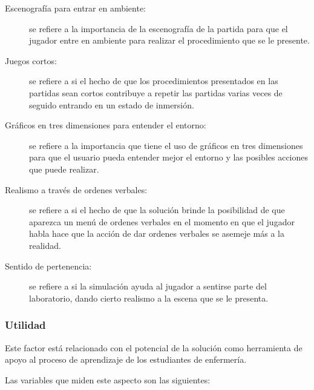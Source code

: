 \begin{description}

\item[Escenografía para entrar en ambiente:] se refiere a la importancia de la
    escenografía de la partida para que el jugador entre en ambiente para
    realizar el procedimiento que se le presente.

\item[Juegos cortos:] se refiere a si el hecho de
    que los procedimientos presentados en las partidas sean cortos contribuye a
    repetir las partidas varias veces de seguido entrando en un estado de
    inmersión.

\item[Gráficos en tres dimensiones para entender el entorno:] se refiere a la
    importancia que tiene el uso de gráficos en tres dimensiones para que el
    usuario pueda entender mejor el entorno y las posibles acciones que puede
    realizar.

\item[Realismo a través de ordenes verbales:] se refiere a si el hecho de que la
    solución brinde la posibilidad de que aparezca un menú de ordenes verbales
    en el momento en que el jugador habla hace que la acción de dar ordenes
    verbales se asemeje más a la realidad.

\item[Sentido de pertenencia:] se refiere a si la simulación ayuda al
    jugador a sentirse parte del laboratorio, dando cierto realismo a la escena
    que se le presenta.

\end{description}

\subsubsection{Utilidad}
\label{sec:sub_utilidad}

Este factor está relacionado con el potencial de la solución como herramienta 
de apoyo al proceso de aprendizaje de los estudiantes de enfermería.

Las variables que miden este aspecto son las siguientes: 

